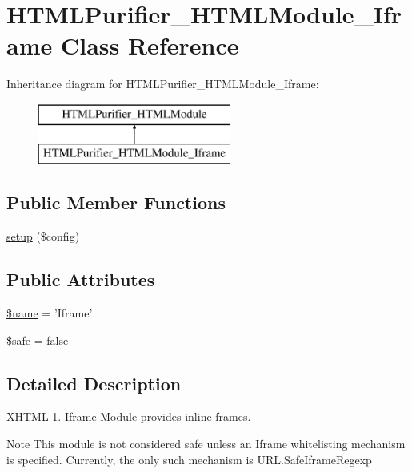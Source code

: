 \hypertarget{classHTMLPurifier__HTMLModule__Iframe}{\section{H\+T\+M\+L\+Purifier\+\_\+\+H\+T\+M\+L\+Module\+\_\+\+Iframe Class Reference}
\label{classHTMLPurifier__HTMLModule__Iframe}
}
Inheritance diagram for H\+T\+M\+L\+Purifier\+\_\+\+H\+T\+M\+L\+Module\+\_\+\+Iframe\+:\begin{figure}[H]
\begin{center}
\leavevmode
\includegraphics[height=2.000000cm]{classHTMLPurifier__HTMLModule__Iframe}
\end{center}
\end{figure}
\subsection*{Public Member Functions}
\begin{DoxyCompactItemize}
\item 
\hyperlink{classHTMLPurifier__HTMLModule__Iframe_abbc1aa0a6638f8bd32d1bfaea9143207}{setup} (\$config)
\end{DoxyCompactItemize}
\subsection*{Public Attributes}
\begin{DoxyCompactItemize}
\item 
\hyperlink{classHTMLPurifier__HTMLModule__Iframe_a8ff094429099da3d6873cfc18eeac9ac}{\$name} = 'Iframe'
\item 
\hyperlink{classHTMLPurifier__HTMLModule__Iframe_a50491af1d5909f99ded97c3d67bd26ff}{\$safe} = false
\end{DoxyCompactItemize}


\subsection{Detailed Description}
X\+H\+T\+M\+L 1. Iframe Module provides inline frames.

\begin{DoxyNote}{Note}
This module is not considered safe unless an Iframe whitelisting mechanism is specified. Currently, the only such mechanism is U\+R\+L.\+Safe\+Iframe\+Regexp 
\end{DoxyNote}


